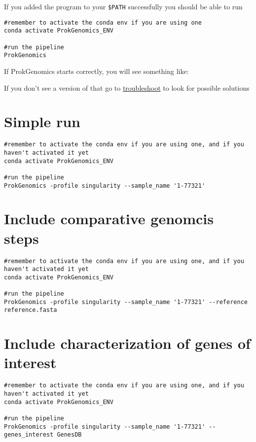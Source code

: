 \documentclass[
]{book}
\begin{document}
If you added the program to your \texttt{\$PATH} successfully you should be able to run

\begin{verbatim}
#remember to activate the conda env if you are using one
conda activate ProkGenomics_ENV

#run the pipeline
ProkGenomics
\end{verbatim}

If ProkGenomics starts correctly, you will see something like:

If you don't see a version of that go to \href{troubleshooting.html}{troubleshoot} to look for possible solutions

\hypertarget{simple-run}{%
\section{Simple run}\label{simple-run}}

\begin{verbatim}
#remember to activate the conda env if you are using one, and if you haven't activated it yet
conda activate ProkGenomics_ENV

#run the pipeline
ProkGenomics -profile singularity --sample_name '1-77321' 
\end{verbatim}

\hypertarget{include-comparative-genomcis-steps}{%
\section{Include comparative genomcis steps}\label{include-comparative-genomcis-steps}}

\begin{verbatim}
#remember to activate the conda env if you are using one, and if you haven't activated it yet
conda activate ProkGenomics_ENV

#run the pipeline
ProkGenomics -profile singularity --sample_name '1-77321' --reference reference.fasta 
\end{verbatim}

\hypertarget{include-characterization-of-genes-of-interest}{%
\section{Include characterization of genes of interest}\label{include-characterization-of-genes-of-interest}}

\begin{verbatim}
#remember to activate the conda env if you are using one, and if you haven't activated it yet
conda activate ProkGenomics_ENV

#run the pipeline
ProkGenomics -profile singularity --sample_name '1-77321' --genes_interest GenesDB 
\end{verbatim}
\end{document}
